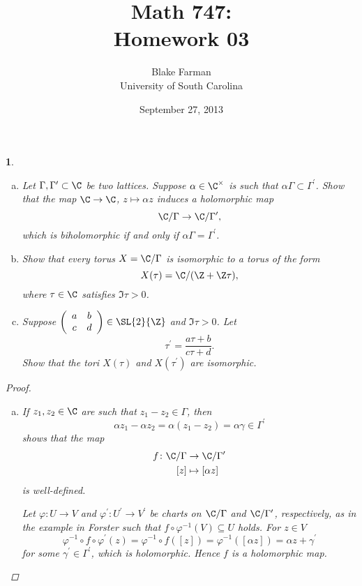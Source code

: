 \documentclass[10pt]{amsart}
\author{Blake Farman\\University of South Carolina}
\title{Math 747:\\Homework 03}
\date{September 27, 2013}
\begin{document}
\maketitle

\providecommand{\p}{\mathfrak{p}}
\providecommand{\m}{\mathfrak{m}}

\newtheorem{thm}{}
\newtheorem{lem}{Lemma}
\newtheorem{prop}{Proposition}
\theoremstyle{definition}
\newtheorem{defn}{Definition}[thm]

\newcommand{\A}{\mathbb{A}}

\begin{thm}
  \begin{enumerate}[(a)]
    \item
      Let $\Gamma, \Gamma^\prime \subset \C$ be two lattices.
      Suppose $\alpha \in \C^\times$ is such that $\alpha \Gamma \subset \Gamma^\prime$.
      Show that the map $\C \rightarrow \C$, $z \mapsto \alpha z$ induces a holomorphic map 
      $$\C/\Gamma \rightarrow \C/\Gamma^\prime,$$
      which is biholomorphic if and only if $\alpha \Gamma = \Gamma^\prime$.
    \item
      Show that every torus $X = \C / \Gamma$ is isomorphic to a torus of the form
      $$X(\tau) = \C/(\Z + \Z\tau),$$
      where $\tau \in \C$ satisfies $\Im{\tau} > 0$.
    \item
      Suppose $\left(\begin{array}{cc}
        a & b\\
        c & d
        \end{array}\right) \in \SL{2}{\Z}$
      and $\Im{\tau} > 0$.
      Let 
      $$\tau^\prime = \frac{a \tau + b}{c \tau + d}.$$
      Show that the tori $X(\tau)$ and $X(\tau^\prime)$ are isomorphic.
  \end{enumerate}

  \begin{proof}
    \begin{enumerate}[(a)]
    \item
      If $z_1, z_2 \in \C$ are such that $z_1 - z_2 \in \Gamma$, then
      $$\alpha z_1 - \alpha z_2 = \alpha(z_1 - z_2) = \alpha\gamma \in \Gamma^\prime$$
      shows that the map
      \begin{align*}
        f \colon \C/\Gamma &\rightarrow \C/\Gamma^\prime\\
        [z] &\mapsto [\alpha z]
      \end{align*}
      is well-defined.
      
      Let $\varphi \colon U \rightarrow V$ and $\varphi^\prime \colon U^\prime \rightarrow V^\prime$ be charts on $\C / \Gamma$ and $\C / \Gamma^\prime$, respectively, as in the example in Forster such that $f \circ \varphi^{-1}(V) \subseteq U$ holds.
      For $z \in V$
      $$\varphi^{-1} \circ f \circ \varphi^\prime (z) = \varphi^{-1} \circ f ([z]) = \varphi^{-1}([\alpha z]) = \alpha z + \gamma^\prime$$
      for some $\gamma^\prime \in \Gamma^\prime$, which is holomorphic.
      Hence $f$ is a holomorphic map.


\end{enumerate}
\end{proof}
\end{thm}
\end{document}
